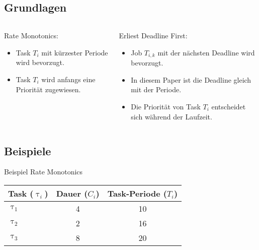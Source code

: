 \subsection{Grundlagen}
\begin{frame}{\subsecname}
		\begin{columns}[]
  			\begin{column}{0.5\textwidth}
				Rate Monotonics:
				\begin{itemize}
					\item Task $T_i$ mit kürzester Periode wird bevorzugt.
					\item Task $T_i$ wird anfangs eine Priorität zugewiesen.
				\end{itemize}

			\end{column}
  			\begin{column}{0.5\textwidth}
  				Erliest Deadline First:
				\begin{itemize}
					\item Job $T_{i, k}$ mit der nächsten Deadline wird bevorzugt.
					\item In diesem Paper ist die Deadline gleich mit der Periode.
					\item Die Priorität von Task $T_i$ entscheidet sich während der Laufzeit.
				\end{itemize}	
  			\end{column}
		\end{columns}
\end{frame}

\subsection{Beispiele}

\newcommand{\showRMSlide}[1] {\begin{frame}{Beispiel Rate Monotonics}
	\begin{center}
		\begin{tabular}{l||c|c}
				Task ($\uptau_i$) & Dauer ($C_i$) & Task-Periode ($T_i$)\\\hline\hline
				$\uptau_1$ & 4 & 10\\
				$\uptau_2$ & 2 & 16\\
				$\uptau_3$ & 8 & 20\\
		\end{tabular}
	\end{center}
	
\end{frame}}

%
{%
	\showRMSlide{\arabic{ct}}
}


